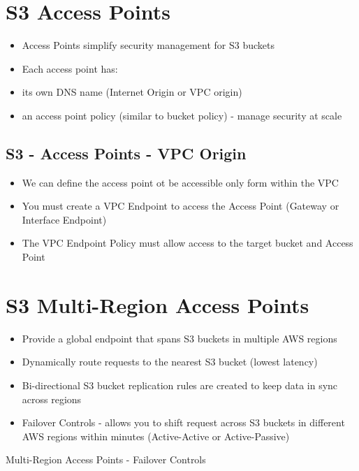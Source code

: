 \section{S3 Access Points}
\begin{itemize}
    \item Access Points simplify security management for S3 buckets
    \item Each access point has:
    \item its own DNS name (Internet Origin or VPC origin)
    \item an access point policy (similar to bucket policy) - manage security at scale
\end{itemize}

\subsection{S3 - Access Points - VPC Origin}
\begin{itemize}
    \item We can define the access point ot be accessible only form within the VPC
    \item You must create a VPC Endpoint to access the Access Point (Gateway or Interface Endpoint)
    \item The VPC Endpoint Policy must allow access to the target bucket and Access Point
\end{itemize}


\section{S3 Multi-Region Access Points}
\begin{itemize}
    \item Provide a global endpoint that spans S3 buckets in multiple AWS regions
    \item Dynamically route requests to the nearest S3 bucket (lowest latency)
    \item Bi-directional S3 bucket replication rules are created to keep data in sync across regions
    \item Failover Controls - allows you to shift request across S3 buckets in different AWS regions within minutes (Active-Active or Active-Passive)
\end{itemize}


Multi-Region Access Points - Failover Controls


